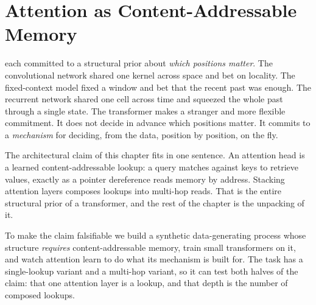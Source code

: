 
\chapter[Attention as Content-Addressable Memory]{Attention as
Content-Addressable Memory}%
\label{ch:transformer}

 each committed to a structural
prior about \emph{which positions matter}. The convolutional network shared
one kernel across space and bet on locality. The fixed-context model fixed a
window and bet that the recent past was enough. The recurrent network shared
one cell across time and squeezed the whole past through a single state. The
transformer makes a stranger and more flexible commitment. It does not
decide in advance which positions matter. It commits to a \emph{mechanism}
for deciding, from the data, position by position, on the fly.

The architectural claim of this chapter fits in one sentence. An attention
head is a learned content-addressable lookup: a query matches against keys
to retrieve values, exactly as a pointer dereference reads memory by
address. Stacking attention layers composes lookups into multi-hop reads.
That is the entire structural prior of a transformer, and the rest of the
chapter is the unpacking of it.

To make the claim falsifiable we build a synthetic data-generating process
whose structure \emph{requires} content-addressable memory, train small
transformers on it, and watch attention learn to do what its mechanism is
built for. The task has a single-lookup variant and a multi-hop variant, so
it can test both halves of the claim: that one attention layer is a lookup,
and that depth is the number of composed lookups.

